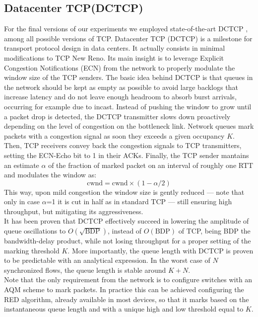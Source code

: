 \subsection{Datacenter TCP(DCTCP)}
\label{sec:dctcp}
For the final versions of our experiments we employed state-of-the-art DCTCP \cite{dctcp}, among all possible versions of TCP.
Datacenter TCP (DCTCP) is a milestone for transport protocol design in data centers. It actually consists in minimal modifications to TCP New Reno. Its main insight is to leverage Explicit Congestion Notifications (ECN) from the network to properly modulate the window size of the TCP senders. The basic idea behind DCTCP is that queues in the network should be kept as empty as possible to avoid large backlogs that increase latency and do not leave enough headroom to absorb burst arrivals, occurring for example due to incast. Instead of pushing the window to grow until a packet drop is detected, the DCTCP transmitter slows down proactively depending on the level of congestion on the bottleneck link. Network queues mark packets with a congestion signal as soon they exceeds a given occupancy $K$. Then, TCP receivers convey back the congestion signals to TCP transmitters, setting the ECN-Echo bit to 1 in their ACKs. Finally, the TCP sender mantains an estimate $\alpha$ of the fraction of marked packet on an interval of roughly one RTT and modulates the window as:
\[ \text{cwnd} = \text{cwnd} \times (1-\alpha/2)\]
This way, upon mild congestion the window size is gently reduced --- note that only in case $\alpha$=1 it is cut in half as in standard TCP --- still ensuring high throughput, but mitigating its aggressiveness.\\It has been proven that DCTCP effectively succeed in lowering the amplitude of queue oscillations to $O(\sqrt{\text{BDP}})$, instead of $O(\text{BDP})$ of TCP, being BDP the bandwidth-delay product, while not losing throughput for a proper setting of the marking threshold $K$. More importantly, the queue length with DCTCP is proven to be predictable with an analytical expression. In the worst case of $N$ synchronized flows, the queue length is stable around $K+N$. \\
Note that the only requirement from the network is to configure switches with an AQM scheme to mark packets. In practice this can be achieved configuring the RED algorithm, already available in most devices, so that it marks based on the instantaneous queue length and with a unique high and low threshold equal to $K$. 
